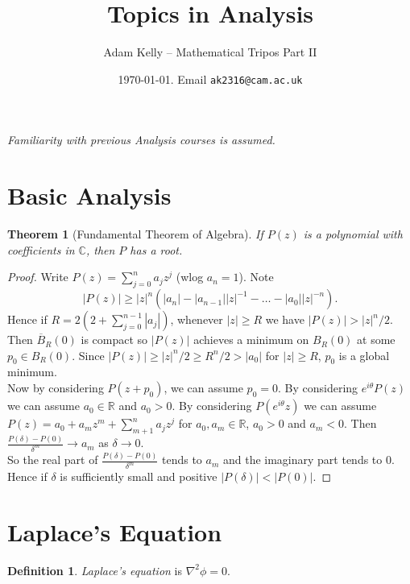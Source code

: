 \documentclass[a4paper, 10pt, twocolumn]{amsart}
\title{Topics in Analysis}
\author{Adam Kelly -- Mathematical Tripos Part II}
\date{\today. Email \texttt{ak2316@cam.ac.uk}}
\newtheorem*{theorem}{Theorem}
\theoremstyle{definition}
\newtheorem*{definition}{Definition}
\newcommand{\bb}[1]{\mathbb{#1}}
\newcommand{\1}{\mathbbm{1}}
\begin{document}
\maketitle

\begin{center}
\emph{Familiarity with previous Analysis courses is assumed.}
\end{center}

\section{Basic Analysis}

\begin{theorem}[Fundamental Theorem of Algebra]
    If $P(z)$ is a polynomial with coefficients in $\bb{C}$, then $P$ has a root.
\end{theorem}

\begin{proof}
    Write $P(z) = \sum_{j=0}^n a_j z^j$ (wlog $a_n = 1$). Note \[|P(z)| \ge |z|^n (|a_n|-|a_{n-1}||z|^{-1}-\ldots -|a_0||z|^{-n}).\] Hence if $R = 2\left(2+\sum_{j=0}^{n-1} |a_j|\right)$, whenever $|z|\ge R$ we have $|P(z)|>|z|^n/2$. Then $\overline{B}_R(0)$ is compact so $|P(z)|$ achieves a minimum on $B_R(0)$ at some $p_0 \in B_R(0)$. Since $|P(z)| \ge |z|^n/2 \ge R^n/2 > |a_0|$ for $|z|\ge R$, $p_0$ is a global minimum.  \\

    Now by considering $P(z+p_0)$, we can assume $p_0 = 0$. By considering $e^{i\theta}P(z)$ we can assume $a_0 \in \bb{R}$ and $a_0 > 0$. By considering $P(e^{i\theta}z)$ we can assume $P(z) = a_0+a_mz^m + \sum_{m+1}^n a_j z^j$ for $a_0,a_m \in \bb{R}$, $a_0>0$ and $a_m<0$. Then $\frac{P(\delta)-P(0)}{\delta^m} \to a_m$ as $\delta\to 0$.\\

    So the real part of $\frac{P(\delta)-P(0)}{\delta^m}$ tends to $a_m$ and the imaginary part tends to $0$. Hence if $\delta$ is sufficiently small and positive $|P(\delta)|<|P(0)|$. 
\end{proof}

\section{Laplace's Equation}

\begin{definition}
    \textit{Laplace's equation} is $\nabla^2 \phi = 0$.
\end{definition}
\end{document}

